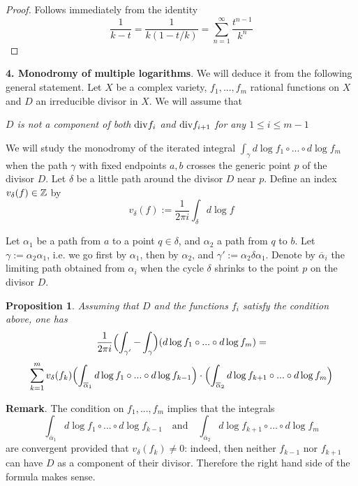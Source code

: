 \documentclass[10pt]{article}
\newtheorem{proposition}[theorem]{Proposition}
\begin{document}
\begin{proof} Follows immediately from the identity
$$
\frac{1}{k -t} = \frac{1}{k(1 -t/k)} = \sum_{n=1}^{\infty}\frac{t^{n-1}}{k^n}
$$


\end{proof}

{\bf 4. Monodromy of multiple logarithms}. We will deduce it from the following 
general statement. Let $X$ be a complex variety, $f_1, ..., f_m$ 
rational functions on $X$ and $D$ an irreducible divisor in $X$. We will assume that 

 {\it $D$ is not a component of 
both ${\rm div}f_i$ and ${\rm div}f_{i+1}$ for any $1 \leq i\leq m-1 $} 

We will study the monodromy of the iterated integral 
$\int_{\gamma } 
d\log f_1  \circ  ...\circ   d\log f_m$ when the path $\gamma$ with fixed endpoints $a,b$ 
crosses the generic point $p$ of the divisor $D$. 
Let $\delta$ be a little path around the divisor $D$ near $p$. 
Define an index $v_{\delta}(f) \in {\mathbb Z}$ by 
$$
v_{\delta}(f):= \frac{1}{2\pi i} \int_{\delta} d\log f 
$$

Let $\alpha_1$ be a path from $a$ to a point $q \in \delta$, and $\alpha_2$ a 
path from $q$ to $b$. 
Let $\gamma:= \alpha_2\alpha_1$, i.e. we go first by 
$\alpha_1$, then by $\alpha_2$, and
 $\gamma':= \alpha_2\delta\alpha_1$. 
Denote by $\overline \alpha_i$ the limiting path obtained from $\alpha_i$ when the cycle $\delta$ shrinks to the point $p$ on the divisor $D$. 

\begin{proposition} \label{hov2} Assuming that $D$ and the functions $f_i$ satisfy the condition above, one has 
$$
\frac{1}{2\pi i}\Bigl(\int_{\gamma'} - 
\int_{\gamma }\Bigr) 
(d\log f_1  \circ  ...\circ   d\log f_m) = 
$$
\begin{equation} \label{UPssala}
\sum_{k=1}^mv_{\delta}(f_k)\Bigl(\int_{\overline \alpha_1} 
d\log f_1  \circ   ...\circ   d\log f_{k-1}\Bigr) \cdot 
\Bigl(\int_{\overline \alpha_2} 
d\log f_{k+1}  \circ   ...\circ   d\log f_m\Bigr)  
\end{equation}
\end{proposition}


{\bf Remark}. The condition on  $f_1, ... ,  f_m$ implies that the  integrals 
$$
\int_{\overline \alpha_1} 
d\log f_1  \circ    ...\circ   d\log f_{k-1}\quad \mbox{and} \quad 
\int_{\overline \alpha_2} 
d\log f_{k+1}   \circ   ...\circ   d\log f_{m} 
$$
are convergent provided that $v_{\delta}(f_k) \not = 0$: indeed, then neither $f_{k-1}$ nor $f_{k+1}$  can have $D$ as a component of their divisor.  
Therefore the right hand side of the formula makes sense. 
\end{document}
